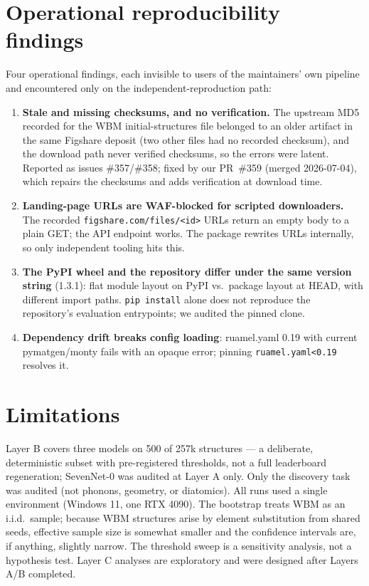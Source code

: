 \documentclass[11pt]{article}
\newcommand{\code}[1]{\texttt{#1}}
\begin{document}
\section{Operational reproducibility findings}

Four operational findings, each invisible to users of the maintainers' own
pipeline and encountered only on the independent-reproduction path:

\begin{enumerate}
\item \textbf{Stale and missing checksums, and no verification.} The
upstream MD5 recorded for the WBM initial-structures file belonged to an
older artifact in the same Figshare deposit (two other files had no recorded
checksum), and the download path never verified checksums, so the errors were
latent. Reported as issues \#357/\#358; fixed by our
PR~\#359 (merged 2026-07-04), which repairs the checksums and adds
verification at download time.
\item \textbf{Landing-page URLs are WAF-blocked for scripted downloaders.}
The recorded \code{figshare.com/files/<id>} URLs return an empty body to a
plain GET; the API endpoint works. The package rewrites URLs internally, so
only independent tooling hits this.
\item \textbf{The PyPI wheel and the repository differ under the same
version string} (1.3.1): flat module layout on PyPI vs.\ package layout at
HEAD, with different import paths. \code{pip install} alone does not
reproduce the repository's evaluation entrypoints; we audited the pinned
clone.
\item \textbf{Dependency drift breaks config loading}: ruamel.yaml 0.19 with
current pymatgen/monty fails with an opaque error; pinning
\code{ruamel.yaml<0.19} resolves it.
\end{enumerate}

\section{Limitations}

Layer B covers three models on 500 of 257k structures --- a deliberate,
deterministic subset with pre-registered thresholds, not a full leaderboard
regeneration; SevenNet-0 was audited at Layer A only. Only the discovery task
was audited (not phonons, geometry, or diatomics). All runs used a single
environment (Windows 11, one RTX 4090). The bootstrap treats WBM as an
i.i.d.\ sample; because WBM structures arise by element substitution from
shared seeds, effective sample size is somewhat smaller and the confidence
intervals are, if anything, slightly narrow. The threshold sweep is a
sensitivity analysis, not a hypothesis test. Layer C analyses are exploratory
and were designed after Layers A/B completed.
\end{document}
